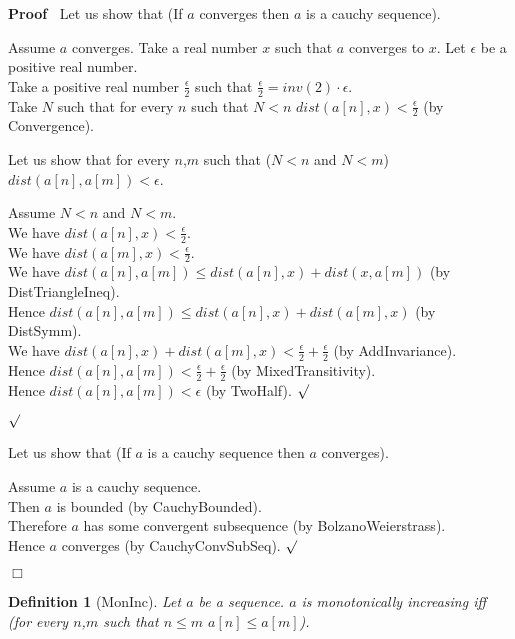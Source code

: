\documentclass{article}
\newenvironment{forthel}{\begin{leftbar}}{\end{leftbar}}
\newenvironment{proof}{\noindent\textbf{Proof\ }}{\hspace*{\fill}$\Box$\medskip}
\newenvironment{subproof}{\begin{list}{}{}
		\item[\text{Proof}]}{\hfill $\surd$ \end{list}}
\newtheorem{definition}{Definition}
\newcommand{\halfeps}{\frac{\epsilon}{2}}
\begin{document}
\begin{forthel}
	\begin{proof}
		Let us show that (If $a$ converges then $a$ is a cauchy sequence).
		\begin{subproof}
			Assume $a$ converges.
			Take a real number $x$ such that $a$ converges to $x$.
			Let $\epsilon$ be a positive real number.\\
			Take a positive real number $\halfeps$ such that $\halfeps = inv(2) \cdot \epsilon$.\\
			Take $N$ such that for every $n$ such that $N < n$ $dist(a[n],x) < \halfeps$ (by Convergence).
			
			Let us show that for every $n$,$m$ such that ($N < n$ and $N < m$) $dist(a[n],a[m]) < \epsilon$.
			\begin{subproof}
				Assume $N < n$ and $N < m$.\\
				We have $dist(a[n],x) < \halfeps$.\\
				We have $dist(a[m],x) < \halfeps$.\\
				We have $dist(a[n],a[m]) \leq dist(a[n],x) + dist(x,a[m])$ (by DistTriangleIneq).\\
				Hence $dist(a[n],a[m]) \leq dist(a[n],x) + dist(a[m],x)$ (by DistSymm).\\
				We have $dist(a[n],x) + dist(a[m],x) < \halfeps + \halfeps$ (by AddInvariance).\\
				Hence $dist(a[n],a[m]) < \halfeps + \halfeps$ (by MixedTransitivity).\\
				Hence $dist(a[n],a[m]) < \epsilon$ (by TwoHalf).
			\end{subproof}
		\end{subproof}
		
		Let us show that (If $a$ is a cauchy sequence then $a$ converges).
		\begin{subproof}
			Assume $a$ is a cauchy sequence.\\
			Then $a$ is bounded (by CauchyBounded).\\
			Therefore $a$ has some convergent subsequence (by BolzanoWeierstrass).\\
			Hence $a$ converges (by CauchyConvSubSeq).
		\end{subproof}
	\end{proof}
	
	
	\begin{definition}[MonInc]
		Let $a$ be a sequence. $a$ is monotonically increasing iff (for every $n$,$m$ such that $n \leq m$ $a[n] \leq a[m]$).
	\end{definition}
	

\end{forthel}
\end{document}
